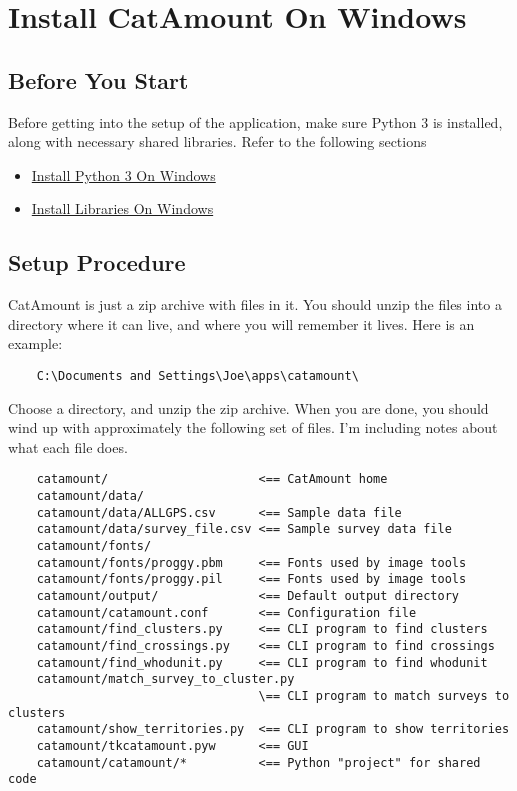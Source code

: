 \chapter{Install CatAmount On Windows}
\hypertarget{windows-install-catamount}{}

\section{Before You Start}

Before getting into the setup of the application, make sure Python 3
is installed, along with necessary shared libraries. Refer to the
following sections

\begin{itemize}
\item \hyperlink{windows-install-python}{Install Python 3 On Windows}
\item \hyperlink{windows-install-libraries}{Install Libraries On Windows}
\end{itemize}

\section{Setup Procedure}

CatAmount is just a zip archive with files in it. You should unzip
the files into a directory where it can live, and where you will
remember it lives. Here is an example:

\begin{verbatim}
    C:\Documents and Settings\Joe\apps\catamount\
\end{verbatim}

Choose a directory, and unzip the zip archive. When you are done,
you should wind up with approximately the following set of files.
I'm including notes about what each file does.

\begin{verbatim}
    catamount/                     <== CatAmount home
    catamount/data/
    catamount/data/ALLGPS.csv      <== Sample data file
    catamount/data/survey_file.csv <== Sample survey data file
    catamount/fonts/
    catamount/fonts/proggy.pbm     <== Fonts used by image tools
    catamount/fonts/proggy.pil     <== Fonts used by image tools
    catamount/output/              <== Default output directory
    catamount/catamount.conf       <== Configuration file
    catamount/find_clusters.py     <== CLI program to find clusters
    catamount/find_crossings.py    <== CLI program to find crossings
    catamount/find_whodunit.py     <== CLI program to find whodunit
    catamount/match_survey_to_cluster.py
                                   \== CLI program to match surveys to clusters
    catamount/show_territories.py  <== CLI program to show territories
    catamount/tkcatamount.pyw      <== GUI
    catamount/catamount/*          <== Python "project" for shared code
\end{verbatim}

